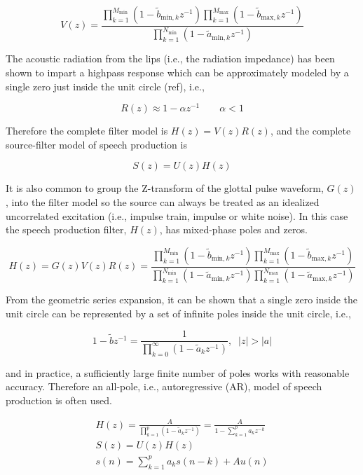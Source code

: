 \[V(z)=
\frac
{\prod_{k=1}^{M_{\mathrm{min}}}(1-\tilde{b}_{\mathrm{min},k}z^{-1})
 \prod_{k=1}^{M_{\mathrm{max}}}(1-\tilde{b}_{\mathrm{max},k}z^{-1})}
{\prod_{k=1}^{N_{\mathrm{min}}}(1-\tilde{a}_{\mathrm{min},k} z^{-1})}
\]

The acoustic radiation from the lips (i.e., the radiation impedance) has been shown to impart a highpass response which can be approximately modeled by a single zero just inside the unit circle (ref), i.e.,

\[R(z)\approx 1-\alpha z^{-1} \qquad \alpha <1\]

Therefore the complete filter model is $H(z)=V(z)R(z)$, and the complete source-filter model of speech production is

\[S(z)=U(z)H(z)\]

It is also common to group the Z-transform of the glottal pulse waveform, $G(z)$, into the filter model so the source can always be treated as an idealized uncorrelated excitation (i.e., impulse train, impulse or white noise). In this case the speech production filter, $H(z)$, has mixed-phase poles and zeros.

\begin{equation}
	H(z) = G(z)V(z)R(z) = 
	\frac
	{\prod_{k=1}^{M_{\mathrm{min}}}(1-\tilde{b}_{\mathrm{min},k}z^{-1})
	 \prod_{k=1}^{M_{\mathrm{max}}}(1-\tilde{b}_{\mathrm{max},k}z^{-1})}
	{\prod_{k=1}^{N_{\mathrm{min}}}(1-\tilde{a}_{\mathrm{min},k} z^{-1})
	 \prod_{k=1}^{N_{\mathrm{max}}}(1-\tilde{a}_{\mathrm{max},k} z^{-1})}
\end{equation}

From the geometric series expansion, it can be shown that a single zero inside the unit circle can be represented by a set of infinite poles inside the unit circle, i.e.,

\begin{equation}
	1-\tilde{b}z^{-1} = \frac{1}{\prod_{k=0}^{\infty}(1-\tilde{a}_k z^{-1})}, \;\; |z| > |a| \label{eq:zero_approx}
\end{equation}

\noindent
and in practice, a sufficiently large finite number of poles works with reasonable accuracy. Therefore an all-pole, i.e., autoregressive (AR), model of speech production is often used.

\begin{eqnarray}
	H(z) = \frac{A}{\prod_{k=1}^{p}(1-\tilde{a}_k z^{-1})} = \frac{A}{1 - \sum_{k=1}^{p} a_k z^{-k}}\\
	S(z)=U(z)H(z) \\
	s(n) = \sum_{k=1}^{p}a_k s(n-k) + A u(n) \label{eq:AR_speech}
\end{eqnarray}

